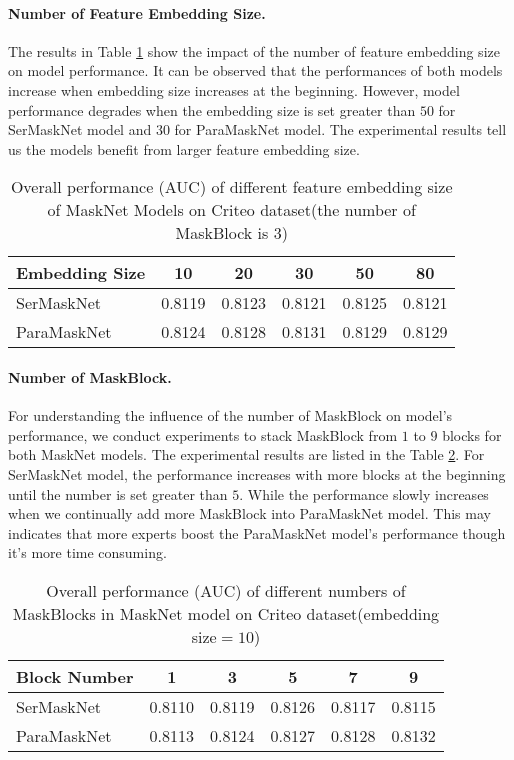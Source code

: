 \documentclass[sigconf]{acmart}
\begin{document}
\paragraph{\textbf{Number of Feature Embedding Size.}}   The results in Table \ref{tab:table5} show the impact of the number of feature embedding size on model performance. It can be observed that the performances of  both models increase when embedding size increases at the beginning. However, model performance degrades when the embedding size is set greater than $50$ for SerMaskNet model and $30$ for ParaMaskNet model. The experimental results tell us the models benefit from larger feature embedding size.


\begin{table}
  \setlength{\abovecaptionskip}{1pt}
  \caption{Overall performance (AUC) of different feature embedding size of MaskNet Models on Criteo dataset(the number of MaskBlock is $3$)}
  \label{tab:table5}
  \begin{tabular}{lccccc}
  \toprule
  Embedding Size &    10 & 20 & 30 & 50 & 80 \\
  \midrule
  SerMaskNet & 0.8119 & 0.8123 & 0.8121 & 0.8125 & 0.8121 \\
  ParaMaskNet & 0.8124 & 0.8128 & 0.8131 & 0.8129 & 0.8129 \\
  \bottomrule
\end{tabular}
\end{table}

\paragraph{\textbf{Number of MaskBlock.}}   For understanding the influence of the number of MaskBlock on model's performance, we conduct experiments to stack MaskBlock from $1$ to $9$ blocks for both MaskNet models.  The experimental results are listed in the Table \ref{tab:table6}. For SerMaskNet model, the performance increases with more blocks at the beginning until the number is set greater than $5$. While the performance slowly increases when we continually add more MaskBlock into ParaMaskNet model. This may indicates that more experts boost the ParaMaskNet model's performance though it's more time consuming.

\begin{table}
  \setlength{\abovecaptionskip}{1pt}
  \caption{Overall performance (AUC) of different numbers of MaskBlocks in MaskNet model on Criteo dataset(embedding size$=10$)}
  \label{tab:table6}
  \begin{tabular}{lccccc}
  \toprule
  Block Number &    1 & 3 & 5 & 7 & 9 \\
  \midrule
  SerMaskNet & 0.8110 & 0.8119 & 0.8126 & 0.8117 & 0.8115 \\
  ParaMaskNet & 0.8113 & 0.8124 & 0.8127 & 0.8128 & 0.8132 \\
  \bottomrule
\end{tabular}
\end{table}
\end{document}
